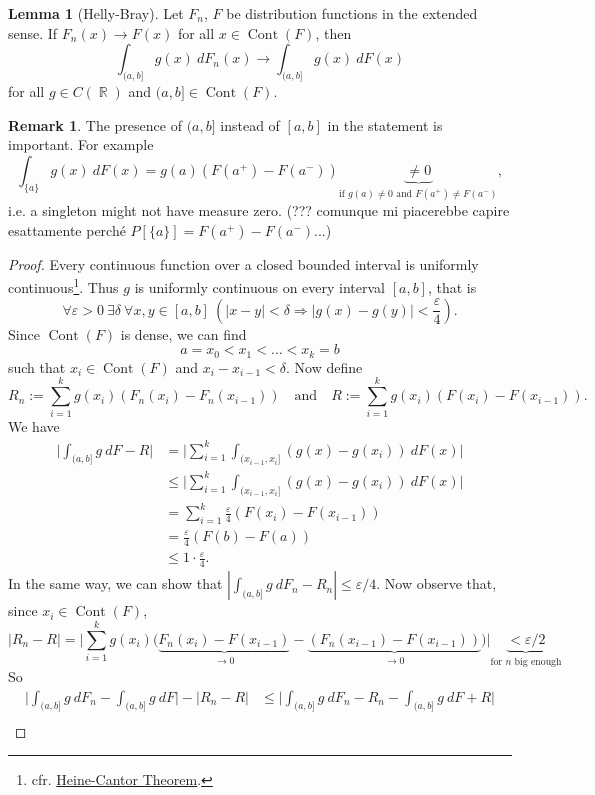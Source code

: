 \documentclass[12pt,a4paper]{report}
\theoremstyle{definition}
\newtheorem{lemma}[theorem]{Lemma}
\newtheorem*{remark}{Remark}
\theoremstyle{num.custom-title}
\DeclareMathOperator{\R}{\mathbb{R}}
\DeclareMathOperator{\imp}{\Rightarrow}
\DeclareMathOperator{\Cont}{Cont}
\renewcommand{\epsilon}{\varepsilon}
\renewcommand{\1}{\mathbbm{1}}
\begin{document}
\begin{lemma}[Helly-Bray]
Let $F_n$, $F$ be distribution functions in the extended sense. If $F_n(x) \to F(x)$ for all $x \in \Cont(F)$, then
\[
\int_{(a,b]} g(x) \ dF_n(x) \to \int_{(a,b]} g(x) \ dF(x)
\]
for all $g \in C(\R)$ and $(a,b] \in \Cont(F)$.
\begin{remark}
The presence of $(a,b]$ instead of $[a,b]$ in the statement is important. For example
\[
\int_{\{a\}} g(x) \ dF(x) = g(a) (F(a^+)-F(a^-)) \underbrace{\neq 0}_{\text{if $g(a) \neq 0$ and $F(a^+) \neq F(a^-)$}},
\]
i.e. a singleton might not have measure zero. (??? comunque mi piacerebbe capire esattamente perché $P[\{a\}]=F(a^+)-F(a^-)$...)
\end{remark}
\begin{proof}
Every continuous function over a closed bounded interval is uniformly continuous\footnote{cfr. \href{http://en.wikipedia.org/wiki/Heine-Cantor_theorem}{Heine-Cantor Theorem}.}. Thus $g$ is uniformly continuous on every interval $[a,b]$, that is
\[
\forall \epsilon>0 \ \exists \delta \ \forall x,y \in [a,b] \ \left( |x-y|<\delta \imp |g(x)-g(y)|<\frac{\epsilon}{4} \right). \tag{$*$}
\]
Since $\Cont(F)$ is dense, we can find
\[
a = x_0 < x_1 < \ldots < x_k = b
\]
such that $x_i \in \Cont(F)$ and $x_i - x_{i-1} < \delta$.
Now define
\[
R_n := \sum_{i=1}^k g(x_i) (F_n(x_i)-F_n(x_{i-1})) \quad \text{and} \quad R := \sum_{i=1}^k g(x_i) (F(x_i)-F(x_{i-1})).
\]
We have
\begin{align*}
\Big| \int_{(a,b]} g \ dF - R \Big|
&= \Big| \sum_{i=1}^k \int_{(x_{i-1},x_i]} (g(x)-g(x_i)) \ dF(x) \Big| \\
&\leq \Big| \sum_{i=1}^k \int_{(x_{i-1},x_i]} (g(x)-g(x_i)) \ dF(x) \Big| \tag{by $(*)$}\\
&= \sum_{i=1}^k \frac{\epsilon}{4} (F(x_i)-F(x_{i-1})) \\
&= \frac{\epsilon}{4} (F(b)-F(a)) \\
&\leq 1 \cdot \frac{\epsilon}{4}. \tag{because $F$ distr. fun. in the ext. sense}
\end{align*}
In the same way, we can show that $|\int_{(a,b]} g \ dF_n - R_n| \leq \epsilon/4$. Now observe that, since $x_i \in \Cont(F)$,
\[
|R_n-R| = \Big| \sum_{i=1}^k g(x_i) \Big( \underbrace{F_n(x_i)-F(x_{i-1})}_{\to 0} - \underbrace{(F_n(x_{i-1}) -F(x_{i-1}))}_{\to 0} \Big) \Big| \underbrace{< \epsilon/2}_{\text{for $n$ big enough}}
\]
So 
\begin{align*}
\Big| \int_{(a,b]} g \ dF_n - \int_{(a,b]} g \ dF \Big| - |R_n - R| &\leq \Big| \int_{(a,b]} g \ dF_n - R_n - \int_{(a,b]} g \ dF + R \Big| \\

\end{align*}
\end{proof}
\end{lemma}
\end{document}
